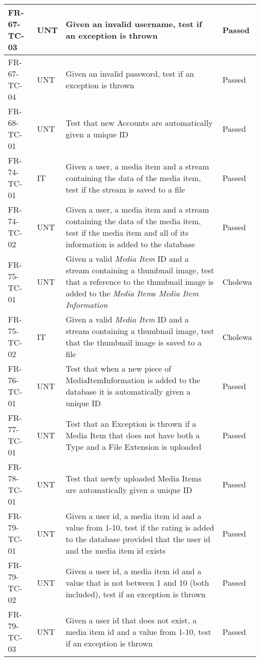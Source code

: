 \documentclass[../report.tex]{subfiles}
\begin{document}
\begin{longtable}{|L{2.1cm}|L{1cm}|L{12.4cm}|L{1.4cm}|}
FR-67-TC-03&UNT&Given an invalid username, test if an exception is thrown&Passed  \\ \hline
FR-67-TC-04&UNT&Given an invalid password, test if an exception is thrown&Passed  \\ \hline
FR-68-TC-01&UNT&Test that new Accounts are automatically given a unique ID&Passed  \\ \hline
FR-74-TC-01&IT&Given a user, a media item and a stream containing the data of the media item, test if the stream is saved to a file&Passed  \\ \hline
FR-74-TC-02&UNT&Given a user, a media item and a stream containing the data of the media item, test if the media item and all of its information is added to the database&Passed  \\ \hline
FR-75-TC-01 & UNT & Given a valid \textit{Media Item} ID and a stream containing a thumbnail image, test that a reference to the thumbnail image is added to the \textit{Media Item}s \textit{Media Item Information} & Cholewa  \\ \hline
FR-75-TC-02 & IT & Given a valid \textit{Media Item} ID and a stream containing a thumbnail image, test that the thumbnail image is saved to a file & Cholewa  \\ \hline
FR-76-TC-01&UNT&Test that when a new piece of MediaItemInformation is added to the database it is automatically given a unique ID&Passed  \\ \hline
FR-77-TC-01&UNT&Test that an Exception is thrown if a Media Item that does not have both a Type and a File Extension is uploaded&Passed  \\ \hline
FR-78-TC-01&UNT&Test that newly uploaded Media Items are automatically given a unique ID&Passed  \\ \hline
FR-79-TC-01&UNT&Given a user id, a media item id and a value from 1-10, test if the rating is added to the database provided that the user id and the media item id exists&Passed  \\ \hline
FR-79-TC-02&UNT&Given a user id, a media item id and a value that is not between 1 and 10 (both included), test if an exception is thrown&Passed  \\ \hline
FR-79-TC-03&UNT&Given a user id that does not exist, a media item id and a value from 1-10, test if an exception is thrown&Passed  \\ \hline

\end{longtable}
\end{document}
